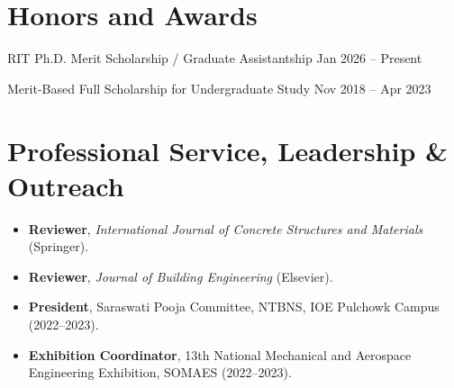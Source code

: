 \documentclass[10pt,letterpaper]{article}
\begin{document}
\section*{Honors and Awards}
RIT Ph.D. Merit Scholarship / Graduate Assistantship \hfill Jan 2026 -- Present\par\vspace{2pt}
Merit-Based Full Scholarship for Undergraduate Study \hfill Nov 2018 -- Apr 2023\par

\section*{Professional Service, Leadership \& Outreach}
\begin{itemize}
  \item \textbf{Reviewer}, \textit{International Journal of Concrete Structures and Materials} (Springer).
  \item \textbf{Reviewer}, \textit{Journal of Building Engineering} (Elsevier).
  \item \textbf{President}, Saraswati Pooja Committee, NTBNS, IOE Pulchowk Campus (2022--2023).
  \item \textbf{Exhibition Coordinator}, 13th National Mechanical and Aerospace Engineering Exhibition, SOMAES (2022--2023).
\end{itemize}
\end{document}

